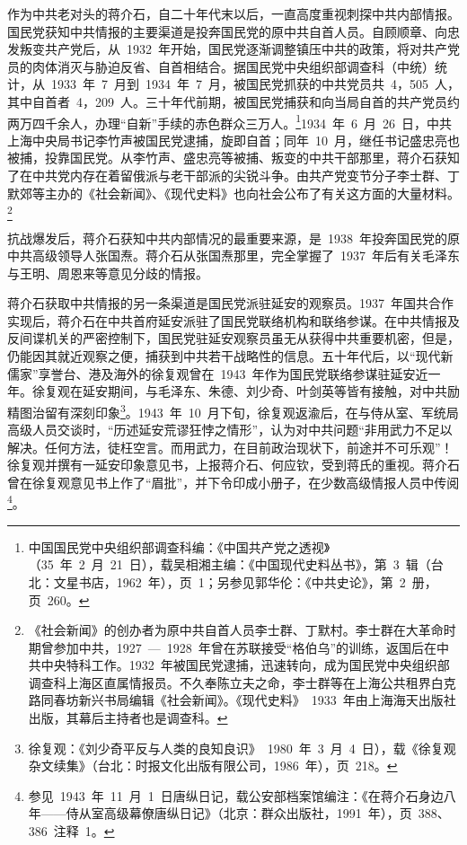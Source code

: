 作为中共老对头的蒋介石，自二十年代末以后，一直高度重视刺探中共内部情报。国民党获知中共情报的主要渠道是投奔国民党的原中共自首人员。自顾顺章、向忠发叛变共产党后，从~1932~年开始，国民党逐渐调整镇压中共的政策，将对共产党员的肉体消灭与胁迫反省、自首相结合。据国民党中央组织部调查科（中统）统计，从~1933~年~7~月到~1934~年~7~月，被国民党抓获的中共党员共~4，505~人，其中自首者~4，209~人。三十年代前期，被国民党捕获和向当局自首的共产党员约两万四千余人，办理“自新”手续的赤色群众三万人。\footnote{中国国民党中央组织部调查科编：《中国共产党之透视》（35~年~2~月~21~日），载吴相湘主编：《中国现代史料丛书》，第~3~辑（台北：文星书店，1962~年），页~1；另参见郭华伦：《中共史论》，第~2~册，页~260。}1934~年~6~月~26~日，中共上海中央局书记李竹声被国民党逮捕，旋即自首；同年~10~月，继任书记盛忠亮也被捕，投靠国民党。从李竹声、盛忠亮等被捕、叛变的中共干部那里，蒋介石获知了在中共党内存在着留俄派与老干部派的尖锐斗争。由共产党变节分子李士群、丁默郊等主办的《社会新闻》、《现代史料》也向社会公布了有关这方面的大量材料。\footnote{《社会新闻》的创办者为原中共自首人员李士群、丁默村。李士群在大革命时期曾参加中共，1927~—~1928~年曾在苏联接受“格伯乌”的训练，返国后在中共中央特科工作。1932~年被国民党逮捕，迅速转向，成为国民党中央组织部调查科上海区直属情报员。不久奉陈立夫之命，李士群等在上海公共租界白克路同春坊新兴书局编辑《社会新闻》。《现代史料》~1933~年由上海海天出版社出版，其幕后主持者也是调查科。}

抗战爆发后，蒋介石获知中共内部情况的最重要来源，是~1938~年投奔国民党的原中共高级领导人张国焘。蒋介石从张国焘那里，完全掌握了~1937~年后有关毛泽东与王明、周恩来等意见分歧的情报。

蒋介石获取中共情报的另一条渠道是国民党派驻延安的观察员。1937~年国共合作实现后，蒋介石在中共首府延安派驻了国民党联络机构和联络参谋。在中共情报及反间谍机关的严密控制下，国民党驻延安观察员虽无从获得中共重要机密，但是，仍能因其就近观察之便，捕获到中共若干战略性的信息。五十年代后，以“现代新儒家”享誉台、港及海外的徐复观曾在~1943~年作为国民党联络参谋驻延安近一年。徐复观在延安期间，与毛泽东、朱德、刘少奇、叶剑英等皆有接触，对中共励精图治留有深刻印象\footnote{徐复观：《刘少奇平反与人类的良知良识》~1980~年~3~月~4~日），载《徐复观杂文续集》（台北：时报文化出版有限公司，1986~年），页~218。}。1943~年~10~月下旬，徐复观返渝后，在与侍从室、军统局高级人员交谈时，“历述延安荒谬狂悖之情形”，认为对中共问题“非用武力不足以解决。任何方法，徒枉空言。而用武力，在目前政治现状下，前途并不可乐观”！徐复观并撰有一延安印象意见书，上报蒋介石、何应钦，受到蒋氏的重视。蒋介石曾在徐复观意见书上作了“眉批”，并下令印成小册子，在少数高级情报人员中传阅\footnote{参见~1943~年~11~月~1~日唐纵日记，载公安部档案馆编注：《在蒋介石身边八年——侍从室高级幕僚唐纵日记》（北京：群众出版社，1991~年），页~388、386~注释~1。}。


